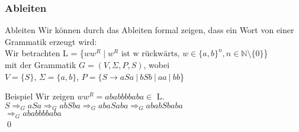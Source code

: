 \subsubsection{Ableiten}
\begin{frame}[fragile]{Ableiten}
  Wir können durch das Ableiten formal zeigen, dass ein Wort von einer Grammatik erzeugt wird:\\
  \small{Wir betrachten L = \{$ww^R \mid w^R\text{ ist w rückwärts, }w \in \{a, b\}^n, n\in \mathbb{N}\setminus \{0\}$\}\\
    mit der Grammatik $G=(V,\Sigma,P,S)$, wobei\\
    $V=\{S\}$, $\Sigma=\{a,b\}$, $P = \{S \rightarrow aSa \ |\ bSb \ |\ aa \ |\ bb$\}}
  \begin{exampleblock}{Beispiel}
    Wir zeigen $ww^R = ababbbbaba \in$ L.\\
    \small{$S\Rightarrow_G aSa \Rightarrow_G abSba \Rightarrow_G  abaSaba \Rightarrow_G ababSbaba$ \\ $\Rightarrow_G ababbbbaba$}\\\qed
  \end{exampleblock}
\end{frame}

